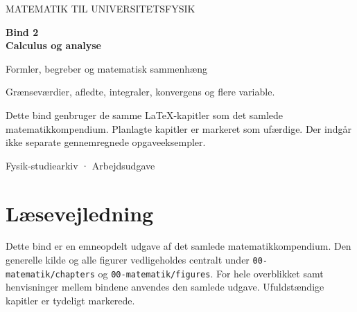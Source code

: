 \documentclass[11pt,a4paper,oneside]{book}
\begin{document}
\frontmatter
\begin{titlepage}
\centering
\vspace*{30mm}
{\sffamily\color{arkivblaa}\Large MATEMATIK TIL UNIVERSITETSFYSIK\par}
\vspace{16mm}
{\Huge\bfseries Bind 2\\[6mm]Calculus og analyse\par}
\vspace{13mm}
{\Large Formler, begreber og matematisk sammenhæng\par}
\vfill
\begin{minipage}{0.8\textwidth}
Grænseværdier, afledte, integraler, konvergens og flere variable.

Dette bind genbruger de samme LaTeX-kapitler som det samlede matematikkompendium. Planlagte kapitler er markeret som ufærdige. Der indgår ikke separate gennemregnede opgaveeksempler.
\end{minipage}
\vspace{14mm}
{\small Fysik-studiearkiv · Arbejdsudgave\par}
\end{titlepage}
\chapter*{Læsevejledning}
Dette bind er en emneopdelt udgave af det samlede matematikkompendium. Den generelle kilde og alle figurer vedligeholdes centralt under \texttt{00-matematik/chapters} og \texttt{00-matematik/figures}. For hele overblikket samt henvisninger mellem bindene anvendes den samlede udgave. Ufuldstændige kapitler er tydeligt markerede.
\begingroup\small\tableofcontents\endgroup
\mainmatter




\end{document}
